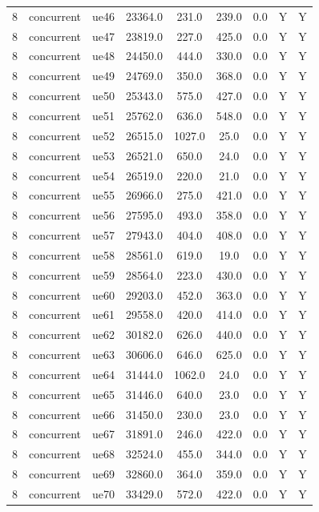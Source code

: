 \begin{table}[ht]
\begin{tabular}{|c|c|c|c|c|c|c|c|c|}
8 & concurrent & ue46 & 23364.0 & 231.0 & 239.0 & 0.0 & Y & Y \\
8 & concurrent & ue47 & 23819.0 & 227.0 & 425.0 & 0.0 & Y & Y \\
8 & concurrent & ue48 & 24450.0 & 444.0 & 330.0 & 0.0 & Y & Y \\
8 & concurrent & ue49 & 24769.0 & 350.0 & 368.0 & 0.0 & Y & Y \\
8 & concurrent & ue50 & 25343.0 & 575.0 & 427.0 & 0.0 & Y & Y \\
8 & concurrent & ue51 & 25762.0 & 636.0 & 548.0 & 0.0 & Y & Y \\
8 & concurrent & ue52 & 26515.0 & 1027.0 & 25.0 & 0.0 & Y & Y \\
8 & concurrent & ue53 & 26521.0 & 650.0 & 24.0 & 0.0 & Y & Y \\
8 & concurrent & ue54 & 26519.0 & 220.0 & 21.0 & 0.0 & Y & Y \\
8 & concurrent & ue55 & 26966.0 & 275.0 & 421.0 & 0.0 & Y & Y \\
8 & concurrent & ue56 & 27595.0 & 493.0 & 358.0 & 0.0 & Y & Y \\
8 & concurrent & ue57 & 27943.0 & 404.0 & 408.0 & 0.0 & Y & Y \\
8 & concurrent & ue58 & 28561.0 & 619.0 & 19.0 & 0.0 & Y & Y \\
8 & concurrent & ue59 & 28564.0 & 223.0 & 430.0 & 0.0 & Y & Y \\
8 & concurrent & ue60 & 29203.0 & 452.0 & 363.0 & 0.0 & Y & Y \\
8 & concurrent & ue61 & 29558.0 & 420.0 & 414.0 & 0.0 & Y & Y \\
8 & concurrent & ue62 & 30182.0 & 626.0 & 440.0 & 0.0 & Y & Y \\
8 & concurrent & ue63 & 30606.0 & 646.0 & 625.0 & 0.0 & Y & Y \\
8 & concurrent & ue64 & 31444.0 & 1062.0 & 24.0 & 0.0 & Y & Y \\
8 & concurrent & ue65 & 31446.0 & 640.0 & 23.0 & 0.0 & Y & Y \\
8 & concurrent & ue66 & 31450.0 & 230.0 & 23.0 & 0.0 & Y & Y \\
8 & concurrent & ue67 & 31891.0 & 246.0 & 422.0 & 0.0 & Y & Y \\
8 & concurrent & ue68 & 32524.0 & 455.0 & 344.0 & 0.0 & Y & Y \\
8 & concurrent & ue69 & 32860.0 & 364.0 & 359.0 & 0.0 & Y & Y \\
8 & concurrent & ue70 & 33429.0 & 572.0 & 422.0 & 0.0 & Y & Y \\

\end{tabular}
\end{table}

